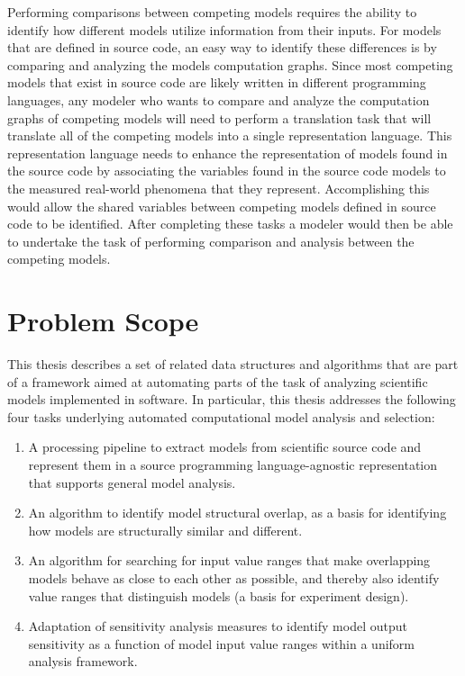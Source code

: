Performing comparisons between competing models requires the ability to identify how different models utilize information from their inputs.
For models that are defined in source code, an easy way to identify these differences is by comparing and analyzing the models computation graphs.
Since most competing models that exist in source code are likely written in different programming languages, any modeler who wants to compare and analyze the computation graphs of competing models will need to perform a translation task that will translate all of the competing models into a single representation language.
This representation language needs to enhance the representation of models found in the source code by associating the variables found in the source code models to the measured real-world phenomena that they represent.
Accomplishing this would allow the shared variables between competing models defined in source code to be identified.
After completing these tasks a modeler would then be able to undertake the task of performing comparison and analysis between the competing models.

\section{Problem Scope\label{sec:prob_scope}}
This thesis describes a set of related data structures and algorithms that are part of a framework aimed at automating parts of the task of analyzing scientific models implemented in software. In particular, this thesis addresses the following four tasks underlying automated computational model analysis and selection:

\begin{enumerate}
  \item A processing pipeline to extract models from scientific source code and represent them in a source programming language-agnostic representation that supports general model analysis.
  \item An algorithm to identify model structural overlap, as a basis for identifying how models are structurally similar and different.
  \item An algorithm for searching for input value ranges that make overlapping models behave as close to each other as possible, and thereby also identify value ranges that distinguish models (a basis for experiment design).
  \item Adaptation of sensitivity analysis measures to identify model output sensitivity as a function of model input value ranges within a uniform analysis framework.
\end{enumerate}

